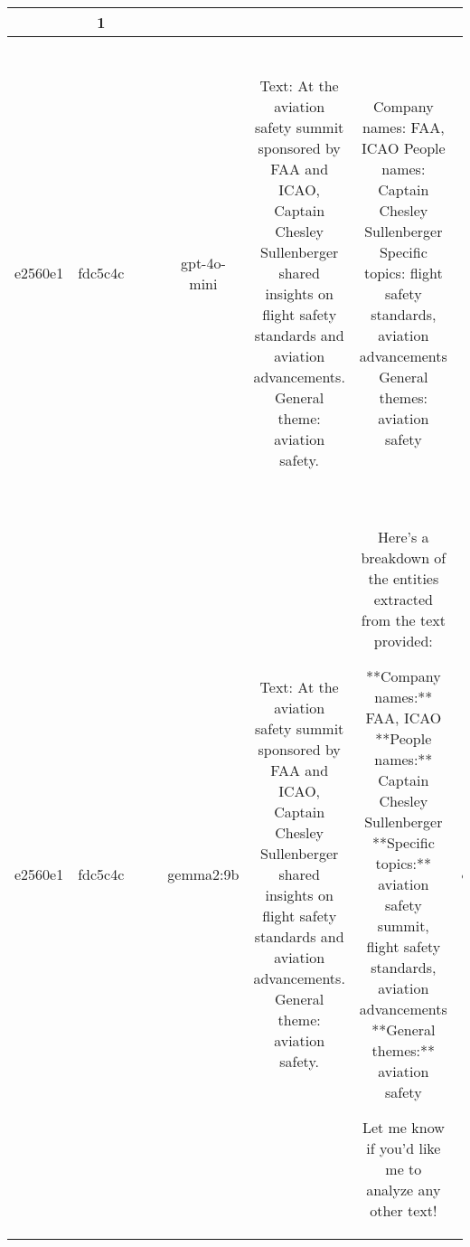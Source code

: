 \begin{table}[h!]
\begin{tabular}{|c|c|c|c|c|c|c|c|c|c|}
{4. **General Themes:** This section starts with "General themes: -||-", listing overarching themes relevant to the content.

There are no format violations as the chatbot output correctly provides each category in the specified format. Thus, it complies with the description provided, and there are no infractions to report.

OK & 1\\
\hline
e2560e1 & fdc5c4c &  &  & gpt-4o-mini & Text: At the aviation safety summit sponsored by FAA and ICAO, Captain Chesley Sullenberger shared insights on flight safety standards and aviation advancements. General theme: aviation safety. & Company names: FAA, ICAO
People names: Captain Chesley Sullenberger
Specific topics: flight safety standards, aviation advancements
General themes: aviation safety & ok & The provided output aligns with the desired format as per the chatbot's description. The output breaks down the extracted elements into the specified categories: Company names, People names, Specific topics, and General themes. Each category is listed separately and formatted correctly, with entries separated by commas where needed.

- The "Company names" section lists "FAA, ICAO".
- The "People names" section lists "Captain Chesley Sullenberger".
- The "Specific topics" section lists "flight safety standards, aviation advancements".
- The "General themes" section lists "aviation safety".

While I cannot verify the accuracy without the input text, the structure and format of the output comply with the description provided for the task.

OK & 1\\
\hline
e2560e1 & fdc5c4c &  &  & gemma2:9b & Text: At the aviation safety summit sponsored by FAA and ICAO, Captain Chesley Sullenberger shared insights on flight safety standards and aviation advancements. General theme: aviation safety. & Here's a breakdown of the entities extracted from the text provided:

**Company names:** FAA, ICAO 
**People names:** Captain Chesley Sullenberger
**Specific topics:** aviation safety summit, flight safety standards, aviation advancements 
**General themes:**  aviation safety 


Let me know if you'd like me to analyze any other text! 
 & err & The chatbot's output has a formatting issue that violates the description provided. According to the description, the extracted elements should be presented in a specific format using <comma_separated_list_of_company_names> and similar placeholders for each category, with the usage of "-||-" to indicate "comma_separated_list." However, the chatbot's output uses bold text and does not incorporate the specified format or placeholders. 

}
\end{tabular}
\end{table}
